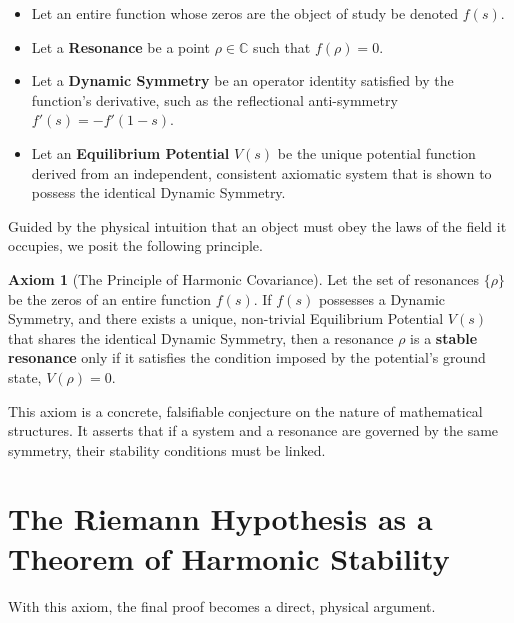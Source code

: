 \documentclass{article}
\theoremstyle{plain}
\theoremstyle{definition}
\newtheorem{axiom}[theorem]{Axiom}
\theoremstyle{remark}
\begin{document}
\begin{itemize}
    \item Let an entire function whose zeros are the object of study be denoted $f(s)$.
    \item Let a \textbf{Resonance} be a point $\rho \in \mathbb{C}$ such that $f(\rho)=0$.
    \item Let a \textbf{Dynamic Symmetry} be an operator identity satisfied by the function's derivative, such as the reflectional anti-symmetry $f'(s) = -f'(1-s)$.
    \item Let an \textbf{Equilibrium Potential} $V(s)$ be the unique potential function derived from an independent, consistent axiomatic system that is shown to possess the identical Dynamic Symmetry.
\end{itemize}

Guided by the physical intuition that an object must obey the laws of the field it occupies, we posit the following principle.

\begin{axiom}[The Principle of Harmonic Covariance]
\label{ax:covariance}
Let the set of resonances $\{\rho\}$ be the zeros of an entire function $f(s)$. If $f(s)$ possesses a Dynamic Symmetry, and there exists a unique, non-trivial Equilibrium Potential $V(s)$ that shares the identical Dynamic Symmetry, then a resonance $\rho$ is a \textbf{stable resonance} only if it satisfies the condition imposed by the potential's ground state, $V(\rho)=0$.
\end{axiom}

This axiom is a concrete, falsifiable conjecture on the nature of mathematical structures. It asserts that if a system and a resonance are governed by the same symmetry, their stability conditions must be linked.

\section{The Riemann Hypothesis as a Theorem of Harmonic Stability}
\label{sec:proof}

With this axiom, the final proof becomes a direct, physical argument.
\end{document}
